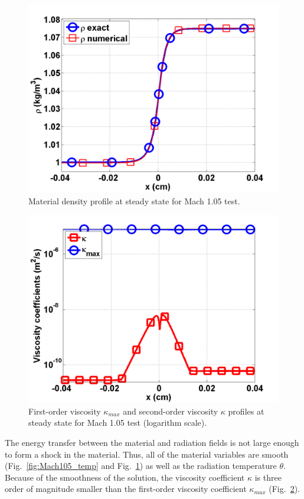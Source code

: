 \documentclass[review]{elsarticle}
\newcommand{\fig}[1]{Fig.~\ref{#1}}                      %
\begin{document}
\begin{figure}[H]
                \centering
                \includegraphics[width=\textwidth]{Mach_1p05_nel_500_density}
        \caption{Material density profile at steady state for Mach 1.05 test.}\label{fig:Mach105_density}
\end{figure}
\begin{figure}[H]
                \centering
                \includegraphics[width=\textwidth]{Mach_1p05_nel_500_viscosity.png}
        \caption{First-order viscosity $\kappa_{max}$ and second-order viscosity $\kappa$ profiles at steady state for Mach 1.05 test (logarithm scale).}\label{fig:Mach105_viscosity}
\end{figure}
The energy transfer between the material and radiation fields is not large enough to form a shock in the material. Thus, all of the material variables are smooth (\fig{fig:Mach105_temp} and \fig{fig:Mach105_density}) as well as the radiation temperature $\theta$. Because of the smoothness of the solution, the viscosity coefficient $\kappa$ is three order of magnitude smaller than the first-order viscosity coefficient $\kappa_{max}$ (\fig{fig:Mach105_viscosity}).
\end{document}
